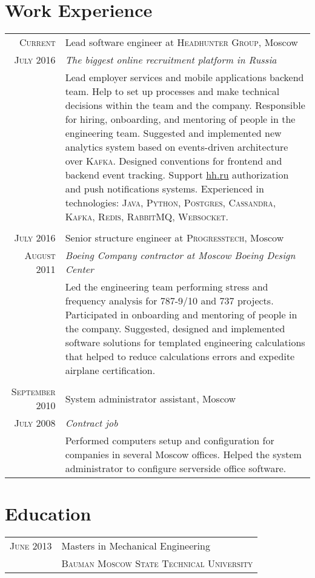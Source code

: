 \documentclass[a4paper,10pt]{article}
\begin{document}
\section{Work Experience}
\begin{tabular}{r|p{11cm}}

  \textsc{Current} & Lead software engineer at \textsc{Headhunter Group}, Moscow \\
  \textsc{July 2016} & \emph{The biggest online recruitment platform in Russia} \\
  & \footnotesize{
      Lead employer services and mobile applications backend team.\newline
      Help to set up processes and make technical decisions within the team and the company. Responsible for hiring, onboarding, and mentoring of people in the engineering team.
      Suggested and implemented new analytics system based on events-driven architecture over \textsc{Kafka}. Designed conventions for frontend and backend event tracking.
      Support \href{https://hh.ru}{hh.ru} authorization and push notifications systems.\newline
      Experienced in technologies: \textsc{Java}, \textsc{Python}, \textsc{Postgres}, \textsc{Cassandra}, \textsc{Kafka}, \textsc{Redis}, \textsc{RabbitMQ}, \textsc{Websocket}.
  } \\\multicolumn{2}{c}{} \\

  \textsc{July 2016} & Senior structure engineer at \textsc{Progresstech}, Moscow \\
  \textsc{August 2011} & \emph{Boeing Company contractor at Moscow Boeing Design Center} \\
  & \footnotesize{
      Led the engineering team performing stress and frequency analysis for 787-9/10 and 737 projects. Participated in onboarding and mentoring of people in the company.\newline
      Suggested, designed and implemented software solutions for templated engineering calculations that helped to reduce calculations errors and expedite airplane certification.
  } \\\multicolumn{2}{c}{} \\

  \textsc{September 2010} & System administrator assistant, Moscow \\
  \textsc{July 2008} & \emph{Contract job} \\
  & \footnotesize{
      Performed computers setup and configuration for companies in several Moscow offices. Helped the system administrator to configure serverside office software.
  }
\end{tabular}

\section{Education}
\begin{tabular}{r|p{11cm}}
  \textsc{June 2013} & Masters in Mechanical Engineering \\ & \textsc{Bauman Moscow State Technical University} \\
\end{tabular}
\end{document}
